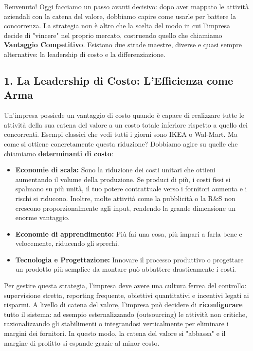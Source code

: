 \documentclass[a4paper,10pt]{article}
\begin{document}
Benvenuto! Oggi facciamo un passo avanti decisivo: dopo aver mappato le attività aziendali con la catena del valore, dobbiamo capire come usarle per battere la concorrenza. La strategia non è altro che la scelta del modo in cui l'impresa decide di "vincere" nel proprio mercato, costruendo quello che chiamiamo \textbf{Vantaggio Competitivo}. Esistono due strade maestre, diverse e quasi sempre alternative: la leadership di costo e la differenziazione.

\subsection*{1. La Leadership di Costo: L'Efficienza come Arma}

Un'impresa possiede un vantaggio di costo quando è capace di realizzare tutte le attività della sua catena del valore a un costo totale inferiore rispetto a quello dei concorrenti. Esempi classici che vedi tutti i giorni sono IKEA o Wal-Mart. Ma come si ottiene concretamente questa riduzione? Dobbiamo agire su quelle che chiamiamo \textbf{determinanti di costo}:

\begin{itemize}
    \item \textbf{Economie di scala:} Sono la riduzione dei costi unitari che ottieni aumentando il volume della produzione. Se produci di più, i costi fissi si spalmano su più unità, il tuo potere contrattuale verso i fornitori aumenta e i rischi si riducono. Inoltre, molte attività come la pubblicità o la R\&S non crescono proporzionalmente agli input, rendendo la grande dimensione un enorme vantaggio.
    \item \textbf{Economie di apprendimento:} Più fai una cosa, più impari a farla bene e velocemente, riducendo gli sprechi.
    \item \textbf{Tecnologia e Progettazione:} Innovare il processo produttivo o progettare un prodotto più semplice da montare può abbattere drasticamente i costi.
\end{itemize}

Per gestire questa strategia, l'impresa deve avere una cultura ferrea del controllo: supervisione stretta, reporting frequente, obiettivi quantitativi e incentivi legati ai risparmi. A livello di catena del valore, l'impresa può decidere di \textbf{riconfigurare} tutto il sistema: ad esempio esternalizzando (outsourcing) le attività non critiche, razionalizzando gli stabilimenti o integrandosi verticalmente per eliminare i margini dei fornitori. In questo modo, la catena del valore si "abbassa" e il margine di profitto si espande grazie al minor costo.
\end{document}
